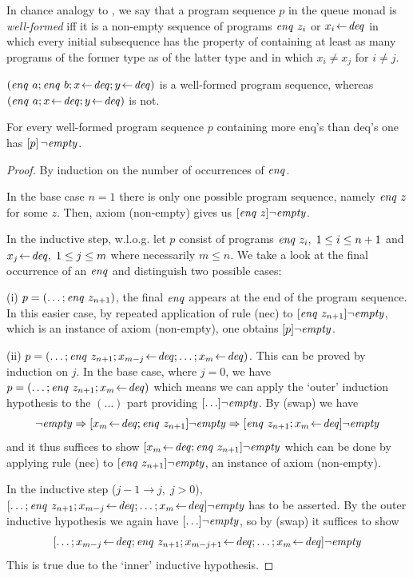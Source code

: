\begin{defn} In chance analogy to \cite{ClaessenHughes}, we say that a program
  sequence $p$ in the queue monad is \emph{well-formed} iff it is a non-empty
  sequence of programs $\mathit{enq}~z_i$ or $x_i\!\gets\! \mathit{deq}$ in which every initial
  subsequence has the property of containing at least as many programs of the
  former type as of the latter type and in which $x_i \neq x_j$ for $i \neq j$.
\end{defn}

\begin{expl}
$(\mathit{enq}~a; \mathit{enq}~b; x \!\gets\! \mathit{deq}; y \!\gets\! \mathit{deq})$ is a well-formed program
  sequence, whereas $(\mathit{enq}~a; x\!\gets\! \mathit{deq}; y\!\gets\! \mathit{deq})$ is not.
\end{expl}

\begin{thm}
\label{wf-empty}
 For every well-formed program sequence $p$ containing more enq's
than deq's one has $[p]\,\lnot \mathit{empty}$.
\end{thm}

\begin{proof} By induction on the number of occurrences of $\mathit{enq}$.

In the base case $n=1$ there is only one possible program sequence, namely
$\mathit{enq}~z$ for some $z$. Then, axiom (non-empty) gives us $[\mathit{enq}~z]\lnot \mathit{empty}$.

In the inductive step, w.l.o.g. let $p$ consist of programs $\mathit{enq}~z_i,\; 1\leq i\leq
n+1$ and $x_j\!\gets\! \mathit{deq},\;1\leq j\leq m$ where necessarily $m\leq n$. We take a look at the final
occurrence of an $\mathit{enq}$ and distinguish two possible cases:

(i) $p =( \ldots; \mathit{enq}~z_{n+1})$, \IE the final $\mathit{enq}$ appears at the end of the
program sequence. In this easier case, by repeated application of rule (nec) to
$[\mathit{enq}~z_{n+1}]\lnot \mathit{empty}$, which is an instance of axiom (non-empty), one
obtains $[p]\lnot \mathit{empty}$.

(ii) $p = (\ldots; \mathit{enq}~z_{n+1}; x_{m-j}\!\gets\! \mathit{deq}; \ldots; x_{m}\!\gets\! \mathit{deq})$. This can be proved by
induction on $j$. In the base case, where $j=0$, we have $p = (\ldots; \mathit{enq}~z_{n+1};
x_{m}\!\gets\! \mathit{deq})$ which means we can apply the `outer' induction hypothesis to the
$(\ldots)$ part providing $[\ldots]\lnot \mathit{empty}$. By (swap) we have 
\[
\lnot \mathit{empty} \Rightarrow [x_m\!\gets\! \mathit{deq}; \mathit{enq}~z_{n+1}]\lnot \mathit{empty} \Rightarrow [\mathit{enq}~z_{n+1}; x_m\!\gets\! \mathit{deq}]\lnot \mathit{empty}
\]
and
it thus suffices to show $[x_m\!\gets\! \mathit{deq}; \mathit{enq}~z_{n+1}]\lnot \mathit{empty}$ which can be done by
applying rule (nec) to $[\mathit{enq}~z_{n+1}]\lnot \mathit{empty}$, an instance of axiom (non-empty).

In the inductive step {\small ($j-1\to j,\;j>0$)},
$[\ldots; \mathit{enq}~z_{n+1}; x_{m-j}\!\gets\! \mathit{deq}; \ldots; x_{m}\!\gets\! \mathit{deq}]\lnot \mathit{empty}$ has to be asserted. By the
outer inductive hypothesis we again have  $[\ldots]\lnot \mathit{empty}$, so by (swap) it suffices
to show 
\[
[\ldots; x_{m-j}\!\gets\! \mathit{deq}; \mathit{enq}~z_{n+1}; x_{m-j+1}\!\gets\! \mathit{deq}; \ldots; x_{m}\!\gets\! \mathit{deq}]\lnot \mathit{empty}
\]
This is true due to the `inner' inductive hypothesis.
\end{proof}

